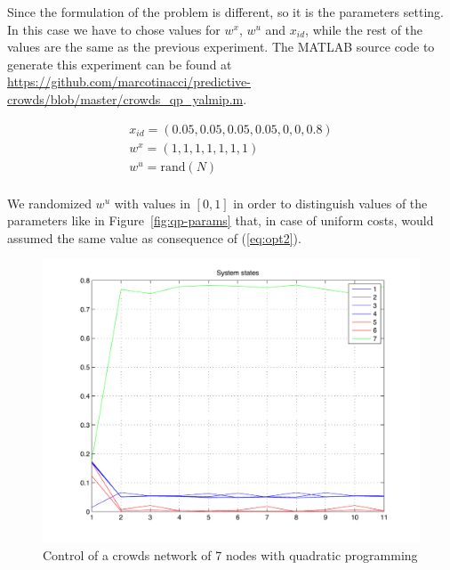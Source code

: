 \documentclass[a4paper, 11pt]{article}
\theoremstyle{definition}
\theoremstyle{remark}
\begin{document}
Since the formulation of the problem is different, so it is the parameters setting. In this case we have to chose values for $w^x$, $w^u$ and $x_{id}$, while the rest of the values are the same as the previous experiment. The MATLAB source code to generate this experiment can be found at \url{https://github.com/marcotinacci/predictive-crowds/blob/master/crowds_qp_yalmip.m}.

\begin{equation}
	\begin{array}{l}
		x_{id} = (0.05, 0.05, 0.05, 0.05, 0, 0, 0.8) \\
		w^x = (1, 1, 1, 1, 1, 1, 1) \\
		w^u = \mbox{rand}(N) \\
	\end{array}
\end{equation}

We randomized $w^u$ with values in $[0,1]$ in order to distinguish values of the parameters like in Figure~\ref{fig:qp-params} that, in case of uniform costs, would assumed the same value as consequence of (\ref{eq:opt2}).

\begin{figure}[htbp!]
	\begin{center}
	\includegraphics[width=.8\textwidth]{images/qp-states}
	\end{center}
	\caption{Control of a crowds network of 7 nodes with quadratic programming}
	\label{fig:qp-states}
\end{figure}
\end{document}

